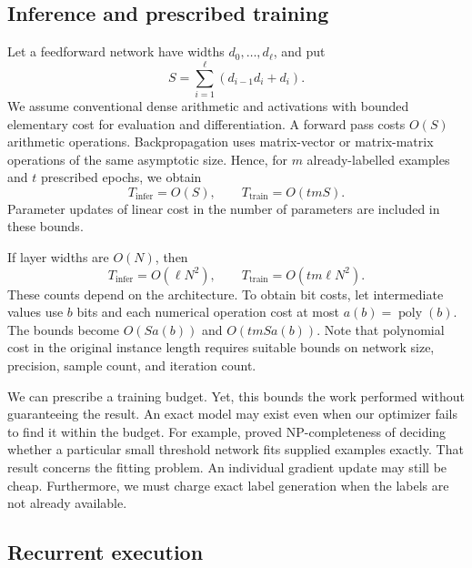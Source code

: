 \documentclass[11pt,a4paper]{article}
\numberwithin{equation}{section}
\newcommand{\poly}{\operatorname{poly}}
\theoremstyle{plain}
\theoremstyle{definition}
\theoremstyle{remark}
\begin{document}
\subsection{Inference and prescribed training}

Let a feedforward network have widths $d_0,\ldots,d_\ell$, and put
\begin{equation}
S=\sum_{i=1}^{\ell}(d_{i-1}d_i+d_i).
\end{equation}
We assume conventional dense arithmetic and activations with bounded elementary cost for evaluation and differentiation. A forward pass costs $O(S)$ arithmetic operations. Backpropagation uses matrix-vector or matrix-matrix operations of the same asymptotic size. Hence, for $m$ already-labelled examples and $t$ prescribed epochs, we obtain
\begin{equation}
T_{\mathrm{infer}}=O(S),\qquad
T_{\mathrm{train}}=O(tmS).
\label{eq:arithmetic}
\end{equation}
Parameter updates of linear cost in the number of parameters are included in these bounds.

If layer widths are $O(N)$, then
\begin{equation}
T_{\mathrm{infer}}=O(\ell N^2),\qquad
T_{\mathrm{train}}=O(tm\ell N^2).
\label{eq:dense}
\end{equation}
These counts depend on the architecture. To obtain bit costs, let intermediate values use $b$ bits and each numerical operation cost at most $a(b)=\poly(b)$. The bounds become $O(Sa(b))$ and $O(tmSa(b))$. Note that polynomial cost in the original instance length requires suitable bounds on network size, precision, sample count, and iteration count.

We can prescribe a training budget. Yet, this bounds the work performed without guaranteeing the result. An exact model may exist even when our optimizer fails to find it within the budget. For example, \citet{blum1988} proved NP-completeness of deciding whether a particular small threshold network fits supplied examples exactly. That result concerns the fitting problem. An individual gradient update may still be cheap. Furthermore, we must charge exact label generation when the labels are not already available.

\subsection{Recurrent execution}
\end{document}
